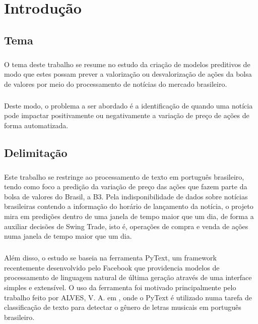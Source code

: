 \documentclass[grad,numbers]{coppe}
\begin{document}
  \tableofcontents
  \listoffigures
  \listoftables
  \printlosymbols
  \printloabbreviations

  \mainmatter
	\chapter{Introdução}
		
		\section{Tema}
			\paragraph{}O tema deste trabalho se resume no estudo da criação de modelos preditivos de modo que estes possam prever a valorização ou desvalorização de ações da bolsa de valores por meio do processamento de notícias do mercado brasileiro.
			\paragraph{}Deste modo, o problema a ser abordado é a identificação de quando uma notícia pode impactar positivamente ou negativamente a variação de preço de ações de forma automatizada.
			
		\section{Delimitação}
			\paragraph{}Este trabalho se restringe ao processamento de texto em português brasileiro, tendo como foco a predição da variação de preço das ações que fazem parte da bolsa de valores do Brasil, a B3. Pela indisponibilidade de dados sobre notícias brasileiras contendo a informação do horário de lançamento da notícia, o projeto mira em predições dentro de uma janela de tempo maior que um dia, de forma a auxiliar decisões de Swing Trade, isto é, operações de compra e venda de ações numa janela de tempo maior que um dia.
			\paragraph{}Além disso, o estudo se baseia na ferramenta PyText, um framework recentemente desenvolvido pelo Facebook que providencia modelos de processamento de linguagem natural de última geração através de uma interface simples e extensível\cite{pytext-paper}. O uso da ferramenta foi motivado principalmente pelo trabalho feito por ALVES, V. A. em \cite{vinicius-pytext}, onde o PyText é utilizado numa tarefa de classificação de texto para detectar o gênero de letras musicais em português brasileiro.
		
\end{document}
